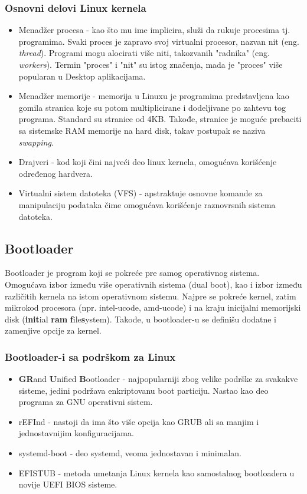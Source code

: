 \documentclass[a4paper,14pt]{article}
\begin{document}
\subsubsection{Osnovni delovi Linux kernela\cite{devibm}}
\begin{itemize}
\item Menadžer procesa - kao što mu ime implicira, služi da rukuje procesima tj. programima. Svaki proces je zapravo svoj virtualni procesor, nazvan nit (eng. \textit{thread}). Programi mogu alocirati više niti, takozvanih "radnika" (eng. \textit{workers}). Termin "proces" i "nit" su istog značenja, mada je "proces" više popularan u Desktop aplikacijama.
\item Menadžer memorije - memorija u Linuxu je programima predstavljena kao gomila stranica koje su potom multiplicirane i dodeljivane po zahtevu tog programa. Standard su stranice od 4KB. Takođe, stranice je moguće prebaciti sa sistemske RAM memorije na hard disk, takav postupak se naziva \textit{swapping}.
\item Drajveri - kod koji čini najveći deo linux kernela, omogućava korišćenje određenog hardvera.
\item Virtualni sistem datoteka (VFS) - apstraktuje osnovne komande za manipulaciju podataka čime omogućava korišćenje raznovrsnih sistema datoteka.
\end{itemize}
\newpage

\subsection{Bootloader}
Bootloader je program koji se pokreće pre samog operativnog sistema. Omogućava izbor između više operativnih sistema (dual boot), kao i izbor između različitih kernela na istom operativnom sistemu. Najpre se pokreće kernel, zatim mikrokod procesora (npr. intel-ucode, amd-ucode) i na kraju inicijalni memorijski disk (\textbf{init}ial \textbf{ram} \textbf{f}ile\textbf{s}ystem). Takođe, u bootloader-u se definišu dodatne i zamenjive opcije za kernel.
\subsubsection{Bootloader-i sa podrškom za Linux}
\begin{itemize}
\item \textbf{GR}and \textbf{U}nified \textbf{B}ootloader - najpopularniji zbog velike podrške za svakakve sisteme, jedini podržava enkriptovanu boot particiju. Nastao kao deo programa za GNU operativni sistem.
\item rEFInd - nastoji da ima što više opcija kao GRUB ali sa manjim i jednostavnijim konfiguracijama.
\item systemd-boot - deo systemd, veoma jednostavan i minimalan.
\item EFISTUB - metoda umetanja Linux kernela kao samostalnog bootloadera u novije UEFI BIOS sisteme.
\end{itemize}
\end{document}
